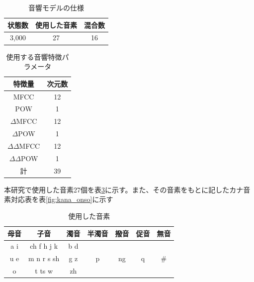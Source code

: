 \begin{table}[H]
  \begin{center}
    \caption{音響モデルの仕様 \label{table:acoustic_model_detail}}
    \begin{tabular}{|c|c|c|} \hline
     状態数  & 使用した音素 & 混合数 \\ \hline
     3,000  & 27 & 16 \\ \hline
    \end{tabular}
  \end{center}
\end{table}

\begin{table}[H]
  \begin{center}
    \caption{使用する音響特徴パラメータ \label{acoustic_model_feature}}
    \begin{tabular}{|c||c|} \hline
      特徴量 & 次元数\\ \hline
      MFCC & 12  \\ \hline
      POW & 1  \\ \hline
      $\Delta$MFCC & 12 \\ \hline
      $\Delta$POW & 1 \\ \hline
      $\Delta\Delta$MFCC & 12 \\ \hline
      $\Delta\Delta$POW & 1 \\ \hline
      計 & 39 \\ \hline
    \end{tabular}
  \end{center}
\end{table}



\vspace{0.2in}\par
本研究で使用した音素27個を表\ref{fig:used_onso}に示す。また、その音素をもとに記したカナ音素対応表を表\ref{fig:kana_onso}に示す


\begin{table}[H]
\begin{center}
\caption{使用した音素 \label{fig:used_onso}}
\begin{tabular}{|c|c|c|c|c|c|c|}
\hline
母音  & 子音         & 濁音  & 半濁音 & 撥音 & 促音 & 無音 \\ \hline
a i & ch f h j k & b d &     &    &    &    \\ 
u e & m n r s sh & g z & p   & ng & q  & \# \\ 
o   & t ts w     & zh  &     &    &    &    \\ \hline
\end{tabular}
\end{center}
\end{table}


